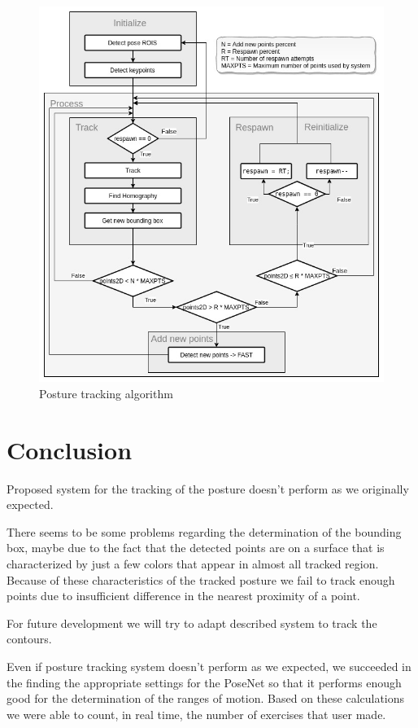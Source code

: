 \documentclass[runningheads,a4paper,11pt]{report}
\begin{document}
\begin{figure}
	\centerline{\includegraphics[scale=0.5]{fig/posture-tracking-algorithm.jpg}}  
	\caption{Posture tracking algorithm}
\end{figure}

\chapter{Conclusion}
\par Proposed system for the tracking of the posture doesn\mbox{'}t perform as we originally expected.
\par There seems to be some problems regarding the determination of the bounding box, maybe due to the fact that the detected points are on a surface that is characterized by just a few colors that appear in almost all tracked region. Because of these characteristics of the tracked posture we fail to track enough points due to insufficient difference in the nearest proximity of a point. 

\par For future development we will try to adapt described system to track the contours.

\par Even if posture tracking system doesn\mbox{'}t perform as we expected, we succeeded in the finding the appropriate settings for the PoseNet so that it performs enough good for the determination of the ranges of motion. Based on these calculations we were able to count, in real time, the number of exercises that user made.




\end{document}
